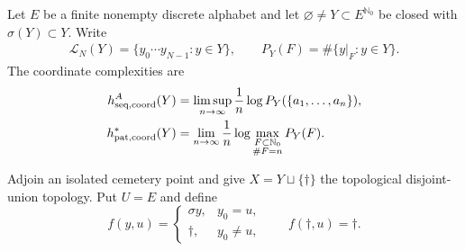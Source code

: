 \documentclass[11pt,reqno]{amsart}
\numberwithin{equation}{section}
\theoremstyle{definition}
\newcommand{\Nzero}{\mathbb N_0}
\newcommand{\Lcal}{\mathcal L}
\begin{document}
Let $E$ be a finite nonempty discrete alphabet and let
$\varnothing\ne Y\subset E^{\Nzero}$ be closed with $\sigma(Y)\subset Y$.
Write
\begin{align*}
 \Lcal_N(Y)=\{y_0\cdots y_{N-1}:y\in Y\},
 \qquad
 P_Y(F)=\#\{y|_F:y\in Y\}.
\end{align*}
The coordinate complexities are
\begin{align*}
 h_{\rm seq,coord}^A(Y)
 &=\limsup_{n\to\infty}\frac1n
   \log P_Y(\{a_1,\ldots,a_n\}),\\
 h_{\rm pat,coord}^*(Y)
 &=\lim_{n\to\infty}\frac1n
   \log\max_{\substack{F\subset\Nzero\\\#F=n}}P_Y(F).
\end{align*}

Adjoin an isolated cemetery point and give
$X=Y\sqcup\{\dagger\}$ the topological disjoint-union topology.  Put $U=E$
and define
\begin{equation}\label{eq:matching-control}
 f(y,u)=
 \begin{cases}
   \sigma y,&y_0=u,\\
   \dagger,&y_0\ne u,
 \end{cases}
 \qquad
 f(\dagger,u)=\dagger.
\end{equation}
\end{document}
